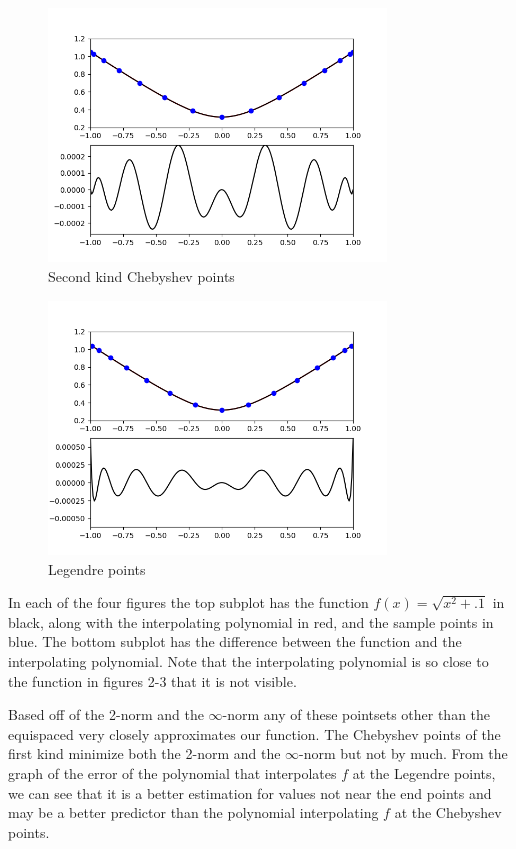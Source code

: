 \documentclass[12pt]{article}
\begin{document}
	\begin{figure}[H]
		\caption{Second kind Chebyshev points}
		\includegraphics[width=0.80\textwidth]{hw4_figure_3}
		\centering
	\end{figure}
	\begin{figure}[H]
		\caption{Legendre points}
		\includegraphics[width=0.80\textwidth]{hw4_figure_4}
		\centering
	\end{figure}

	In each of the four figures the top subplot has the function $f(x) = \sqrt{x^2 + .1}$  in black, along with the interpolating polynomial in red, and the sample points in blue. The bottom subplot has the difference between the function and the interpolating polynomial. Note that the interpolating polynomial is so close to the function in figures 2-3 that it is not visible. \bigbreak
	
	Based off of the 2-norm and the $\infty$-norm any of these pointsets other than the equispaced very closely approximates our function. The Chebyshev points of the first kind minimize both the 2-norm and the $\infty$-norm but not by much. From the graph of the error of the polynomial that interpolates $f$ at the Legendre points, we can see that it is a better estimation for values not near the end points and may be a better predictor than the polynomial interpolating $f$ at the Chebyshev points. \bigbreak
	
\end{document}
